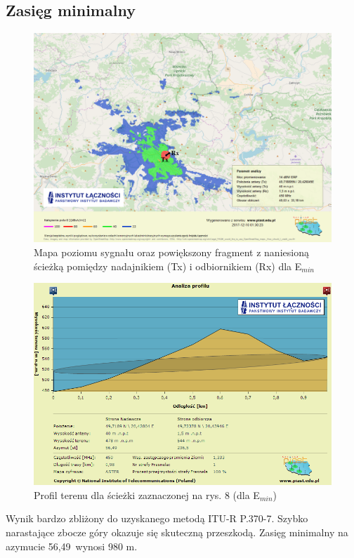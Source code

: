\documentclass[12pt, a4paper, oneside]{article}
\begin{document}
\subsection{Zasięg minimalny}
\begin{figure}[h!]
\centering
\includegraphics[scale=0.45]{pics/piast/f2.png}
\caption{Mapa poziomu sygnału oraz powiększony fragment z naniesioną ścieżką pomiędzy nadajnikiem (Tx) i odbiornikiem (Rx) dla E$_{min}$}
\end{figure}
\begin{figure}[h!]
\centering
\includegraphics[scale=0.45]{pics/piast/f4.png}
\caption{Profil terenu dla ścieżki zaznaczonej na rys. 8 (dla E$_{min}$)}
\end{figure}
Wynik bardzo zbliżony do uzyskanego metodą ITU-R P.370-7. Szybko narastające zbocze góry okazuje się skuteczną przeszkodą. Zasięg minimalny na azymucie 56,49\textdegree ~wynosi 980 m.
\clearpage
\end{document}

